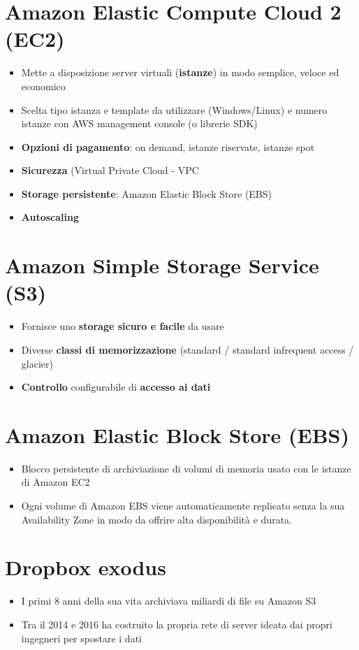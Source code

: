 \documentclass[a4paper, 12pt]{report}
\begin{document}
      \section{Amazon Elastic Compute Cloud 2 (EC2)}
      \begin{itemize}
        \item Mette a disposizione server virtuali (\textbf{istanze}) in modo semplice, veloce ed economico 
        \item Scelta tipo istanza e template da utilizzare (Windows/Linux) e numero istanze
        con AWS management console (o librerie SDK)
        \item \textbf{Opzioni di pagamento}: on demand, istanze riservate, istanze spot
        \item \textbf{Sicurezza} (Virtual Private Cloud - VPC
        \item \textbf{Storage persistente}: Amazon Elastic Block Store (EBS)
        \item \textbf{Autoscaling}
      \end{itemize}
      \section{Amazon Simple Storage Service (S3)}
      \begin{itemize}
        \item Fornisce uno \textbf{storage sicuro e facile} da usare
        \item Diverse \textbf{classi di memorizzazione} (standard / standard infrequent access / glacier)
        \item \textbf{Controllo} configurabile di \textbf{accesso ai dati}
      \end{itemize}
      \section{Amazon Elastic Block Store (EBS)}
      \begin{itemize}
        \item Blocco persistente di archiviazione di volumi di memoria usato con le istanze di Amazon EC2
        \item Ogni volume di Amazon EBS viene automaticamente replicato senza la sua Availability Zone in modo da offrire alta disponibilità e durata. 
      \end{itemize}
      \section{Dropbox exodus}
        \begin{itemize}
          \item I primi 8 anni della sua vita archiviava miliardi di file su Amazon S3
          \item Tra il 2014 e 2016 ha costruito la propria rete di server ideata dai propri ingegneri per spostare i dati
        \end{itemize}
\end{document}

